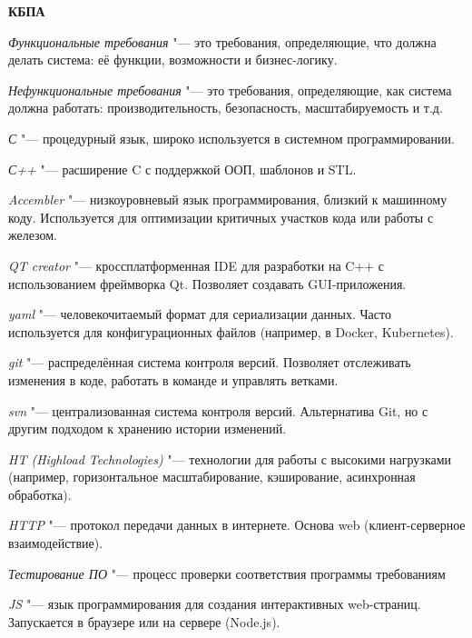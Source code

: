 \documentclass{article}
\begin{document}
\begin{center}
    \textbf{КБПА}
\end{center}

\textit{Функциональные требования} "--- это требования, определяющие, что должна делать система: её функции, возможности и бизнес-логику.

\textit{Нефункциональные требования} "--- это требования, определяющие, как система должна работать: производительность, безопасность, масштабируемость и т.д.

\textit{С} "--- процедурный язык, широко используется в системном программировании.

\textit{С++} "--- расширение C с поддержкой ООП, шаблонов и STL.

\textit{Accembler} "--- низкоуровневый язык программирования, близкий к машинному коду. Используется для оптимизации критичных участков кода или работы с железом.

\textit{QT creator} "--- кроссплатформенная IDE для разработки на C++ с использованием фреймворка Qt. Позволяет создавать GUI-приложения.

\textit{yaml} "--- человекочитаемый формат для сериализации данных. Часто используется для конфигурационных файлов (например, в Docker, Kubernetes).

\textit{git} "--- распределённая система контроля версий. Позволяет отслеживать изменения в коде, работать в команде и управлять ветками.

\textit{svn} "--- централизованная система контроля версий. Альтернатива Git, но с другим подходом к хранению истории изменений.

\textit{HT (Highload Technologies)} "--- технологии для работы с высокими нагрузками (например, горизонтальное масштабирование, кэширование, асинхронная обработка).

\textit{HTTP} "--- протокол передачи данных в интернете. Основа web (клиент-серверное взаимодействие).

\textit{Тестирование ПО} "--- процесс проверки соответствия программы требованиям

\textit{JS} "--- язык программирования для создания интерактивных web-страниц. Запускается в браузере или на сервере (Node.js). 
\end{document}
